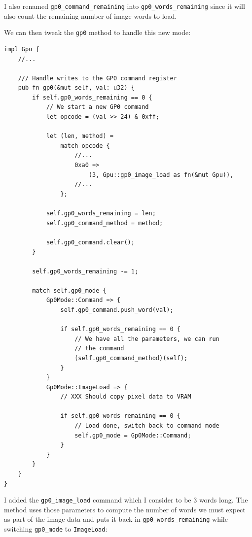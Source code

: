 \documentclass[a4paper]{article}
\newcommand{\code}[1] {\texttt{#1}}
\begin{document}
I also renamed \code{gp0\_command\_remaining} into
\code{gp0\_words\_remaining} since it will also count the remaining
number of image words to load.

We can then tweak the \code{gp0} method to handle this new mode:

\begin{lstlisting}
impl Gpu {
    //...

    /// Handle writes to the GP0 command register
    pub fn gp0(&mut self, val: u32) {
        if self.gp0_words_remaining == 0 {
            // We start a new GP0 command
            let opcode = (val >> 24) & 0xff;

            let (len, method) =
                match opcode {
                    //...
                    0xa0 =>
                        (3, Gpu::gp0_image_load as fn(&mut Gpu)),
                    //...
                };

            self.gp0_words_remaining = len;
            self.gp0_command_method = method;

            self.gp0_command.clear();
        }

        self.gp0_words_remaining -= 1;

        match self.gp0_mode {
            Gp0Mode::Command => {
                self.gp0_command.push_word(val);

                if self.gp0_words_remaining == 0 {
                    // We have all the parameters, we can run
                    // the command
                    (self.gp0_command_method)(self);
                }
            }
            Gp0Mode::ImageLoad => {
                // XXX Should copy pixel data to VRAM

                if self.gp0_words_remaining == 0 {
                    // Load done, switch back to command mode
                    self.gp0_mode = Gp0Mode::Command;
                }
            }
        }
    }
}
\end{lstlisting}

I added the \code{gp0\_image\_load} command which I consider to be 3
words long. The method uses those parameters to compute the number of
words we must expect as part of the image data and puts it back in
\code{gp0\_words\_remaining} while switching \code{gp0\_mode} to
\code{ImageLoad}:
\end{document}
